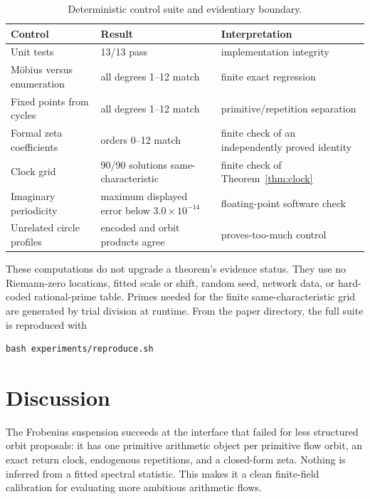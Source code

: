 \documentclass[11pt]{article}
\theoremstyle{definition}
\theoremstyle{remark}
\begin{document}
\begin{table}[t]
\centering
\caption{Deterministic control suite and evidentiary boundary.}
\label{tab:controls}
\small
\begin{tabularx}{\textwidth}{@{}L{0.29\textwidth}L{0.20\textwidth}Y@{}}
\toprule
Control & Result & Interpretation\\
\midrule
Unit tests & 13/13 pass & implementation integrity\\
M\"obius versus enumeration & all degrees 1--12 match & finite exact regression\\
Fixed points from cycles & all degrees 1--12 match & primitive/repetition separation\\
Formal zeta coefficients & orders 0--12 match & finite check of an independently proved identity\\
Clock grid & 90/90 solutions same-characteristic & finite check of Theorem~\ref{thm:clock}\\
Imaginary periodicity & maximum displayed error below \(3.0\times10^{-14}\) & floating-point software check\\
Unrelated circle profiles & encoded and orbit products agree & proves-too-much control\\
\bottomrule
\end{tabularx}
\end{table}

These computations do not upgrade a theorem's evidence status.  They use no
Riemann-zero locations, fitted scale or shift, random seed, network data, or
hard-coded rational-prime table.  Primes needed for the finite
same-characteristic grid are generated by trial division at runtime.  From
the paper directory, the full suite is reproduced with
\begin{verbatim}
bash experiments/reproduce.sh
\end{verbatim}

\section{Discussion}
\label{sec:discussion}

The Frobenius suspension succeeds at the interface that failed for less
structured orbit proposals: it has one primitive arithmetic object per
primitive flow orbit, an exact return clock, endogenous repetitions, and a
closed-form zeta.  Nothing is inferred from a fitted spectral statistic.
This makes it a clean finite-field calibration for evaluating more ambitious
arithmetic flows.
\end{document}
